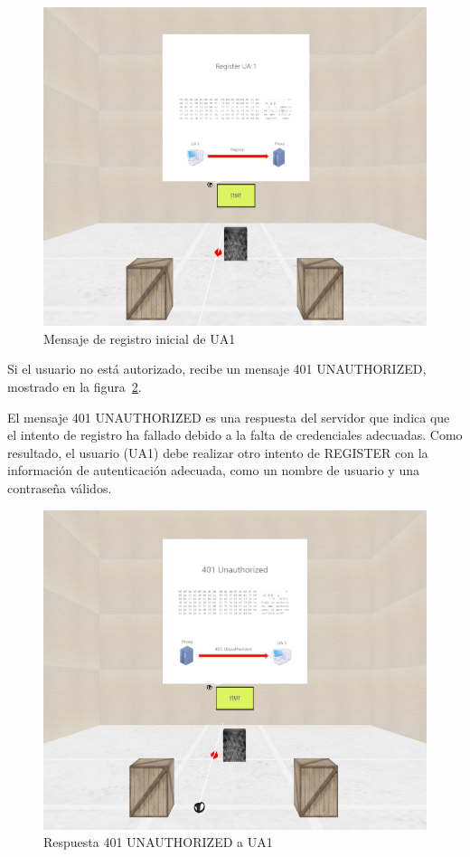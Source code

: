 \documentclass[a4paper, 12pt]{book}
\begin{document}
\begin{figure}[H]
  \centering
  \includegraphics[width=12cm, keepaspectratio]{img/resultados/01-Register_UA1.PNG}
  \caption{Mensaje de registro inicial de UA1}
  \label{fig:01-Register_UA1}
\end{figure}
\clearpage

Si el usuario no está autorizado, recibe un mensaje 401 UNAUTHORIZED, mostrado en la figura~\ref{fig:02-Unauthorized}. 

El mensaje 401 UNAUTHORIZED es una respuesta del servidor que indica que el intento de registro ha fallado debido a la falta de 
credenciales adecuadas. Como resultado, el usuario (UA1) debe realizar otro intento de REGISTER con la información de autenticación 
adecuada, como un nombre de usuario y una contraseña válidos.

\bigskip

\begin{figure}[H]
  \centering
  \includegraphics[width=12cm, keepaspectratio]{img/resultados/02-Unautorized.PNG}
  \caption{Respuesta 401 UNAUTHORIZED a UA1}
  \label{fig:02-Unauthorized}
\end{figure}
\clearpage
\end{document}
